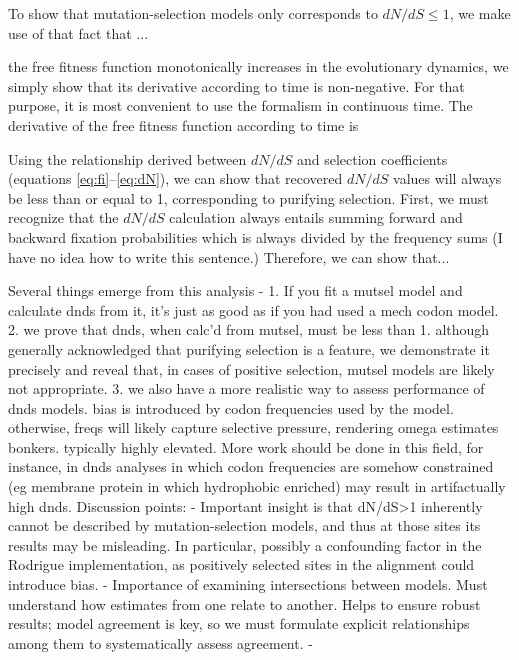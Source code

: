 \documentclass[11pt]{article}
\begin{document}
To show that mutation-selection models only corresponds to $dN/dS \leq 1$, we make use of that fact that ... 

the free fitness function monotonically increases in the evolutionary dynamics, we simply show that its derivative according to time is non-negative. For that purpose, it is most convenient to use the formalism in continuous time. The derivative of the free fitness function according to time is

Using the relationship derived between $dN/dS$ and selection coefficients (equations \eqref{eq:fi}--\eqref{eq:dN}), we can show that recovered $dN/dS$ values will always be less than or equal to 1, corresponding to purifying selection. 
First, we must recognize that the $dN/dS$ calculation always entails summing forward and backward fixation probabilities which is always divided by the frequency sums (I have no idea how to write this sentence.) Therefore, we can show that...










	
\newpage
	
	
	
 Several things emerge from this analysis - 
1. If you fit a mutsel model and calculate dnds from it, it's just as good as if you had used a mech codon model. 
2. we prove that dnds, when calc'd from mutsel, must be less than 1. although generally acknowledged that purifying selection is a feature, we demonstrate it precisely and reveal that, in cases of positive selection, mutsel models are likely not appropriate.
3. we also have a more realistic way to assess performance of dnds models. bias is introduced by codon frequencies used by the model. otherwise, freqs will likely capture selective pressure, rendering omega estimates bonkers. typically highly elevated. More work should be done in this field, for instance, in dnds analyses in which codon frequencies are somehow constrained (eg membrane protein in which hydrophobic enriched) may result in artifactually high dnds.
Discussion points:
- Important insight is that dN/dS>1 inherently cannot be described by mutation-selection models, and thus at those sites its results may be misleading. In particular, possibly a confounding factor in the Rodrigue implementation, as positively selected sites in the alignment could introduce bias.
- Importance of examining intersections between models. Must understand how estimates from one relate to another. Helps to ensure robust results; model agreement is key, so we must formulate explicit relationships among them to systematically assess agreement.
- 
\end{document}
